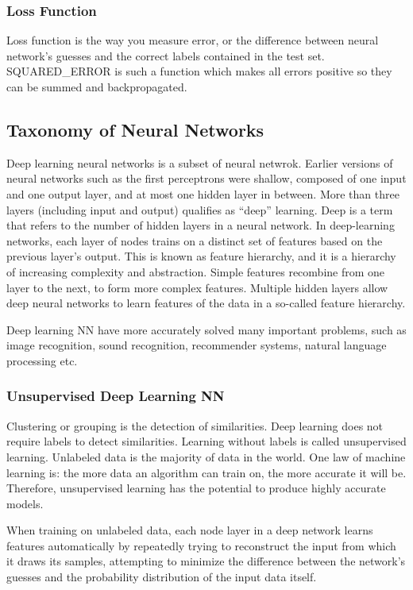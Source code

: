 \documentclass[10pt]{llncs}
\begin{document}
\subsubsection{Loss Function}
Loss function is the way you measure error, or the difference between neural network’s guesses and the correct labels contained in the test set. SQUARED_ERROR is such a function which makes all errors positive so they can be summed and backpropagated.

%
\subsection{Taxonomy of Neural Networks}
Deep learning neural networks is a subset of neural netwrok. Earlier versions of neural networks such as the first perceptrons were shallow, composed of one input and one output layer, and at most one hidden layer in between. More than three layers (including input and output) qualifies as “deep” learning. Deep is a term that refers to the number of hidden layers in a neural network. In deep-learning networks, each layer of nodes trains on a distinct set of features based on the previous layer’s output. This is known as feature hierarchy, and it is a hierarchy of increasing complexity and abstraction. Simple features recombine from one layer to the next, to form more complex features. Multiple hidden layers allow deep neural networks to learn features of the data in a so-called feature hierarchy. 

Deep learning NN have more accurately solved many important problems, such as image recognition, sound recognition, recommender systems, natural language processing etc. 

%
\subsubsection{Unsupervised Deep Learning NN}
Clustering or grouping is the detection of similarities. Deep learning does not require labels to detect similarities. Learning without labels is called unsupervised learning. Unlabeled data is the majority of data in the world. One law of machine learning is: the more data an algorithm can train on, the more accurate it will be. Therefore, unsupervised learning has the potential to produce highly accurate models.

When training on unlabeled data, each node layer in a deep network learns features automatically by repeatedly trying to reconstruct the input from which it draws its samples, attempting to minimize the difference between the network’s guesses and the probability distribution of the input data itself.
\end{document}
